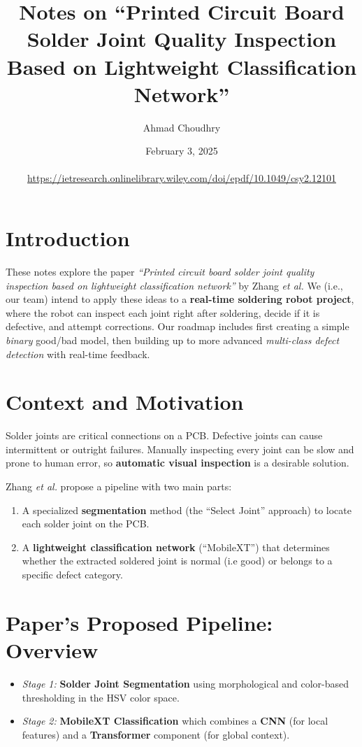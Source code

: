 \documentclass{article}
\title{Notes on ``Printed Circuit Board Solder Joint Quality Inspection Based on Lightweight Classification Network''}
\author{Ahmad Choudhry}
\date{February 3, 2025\\\\
\url{https://ietresearch.onlinelibrary.wiley.com/doi/epdf/10.1049/csy2.12101}}
\begin{document}
\maketitle

\section{Introduction}

These notes explore the paper 
\emph{``Printed circuit board solder joint quality inspection based on lightweight classification network''} 
by Zhang \emph{et al.} 
We (i.e., our team) intend to apply these ideas to a \textbf{real-time soldering robot project}, 
where the robot can inspect each joint right after soldering, decide if it is defective, and attempt corrections. 
Our roadmap includes first creating a simple \emph{binary} good/bad model, 
then building up to more advanced \emph{multi-class defect detection} with real-time feedback.

\section{Context and Motivation}

Solder joints are critical connections on a PCB. 
Defective joints can cause intermittent or outright failures. 
Manually inspecting every joint can be slow and prone to human error, 
so \textbf{automatic visual inspection} is a desirable solution.

Zhang \emph{et al.} propose a pipeline with two main parts:
\begin{enumerate}
   \item A specialized \textbf{segmentation} method (the ``Select Joint'' approach) to locate each solder joint on the PCB.
   \item A \textbf{lightweight classification network} (``MobileXT'') that determines whether the extracted soldered joint is normal (i.e good) or belongs to a specific defect category.
\end{enumerate}

\section{Paper’s Proposed Pipeline: Overview}

\begin{itemize}
    \item \emph{Stage 1:} \textbf{Solder Joint Segmentation} using morphological and color-based thresholding in the HSV color space. 
    \item \emph{Stage 2:} \textbf{MobileXT Classification} which combines a \textbf{CNN} (for local features) and a \textbf{Transformer} component (for global context).
\end{itemize}
\end{document}
